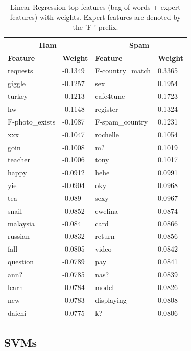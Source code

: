 \documentclass[preprint]{acm_proc_article-sp}
\begin{document}
\begin{table}
\begin{tabular}{l|l||l|l}
\multicolumn{2}{c}{\textbf{Ham}} & 
\multicolumn{2}{c}{\textbf{Spam}} \\
\hline
\textbf{Feature} & \textbf{Weight} & \textbf{Feature} & \textbf{Weight} \\
\hline

requests & -0.1349 & F-country\_match & 0.3365\\
giggle & -0.1257 & sex & 0.1954\\
turkey & -0.1213 & cafe4tune & 0.1723\\
hw & -0.1148 & register & 0.1324\\
F-photo\_exists & -0.1087 & F-spam\_country & 0.1231\\
xxx & -0.1047 & rochelle & 0.1054\\
goin & -0.1008 & m? & 0.1019\\
teacher & -0.1006 & tony & 0.1017\\
happy & -0.0912 & hehe & 0.0991\\
yie & -0.0904 & oky & 0.0968\\
tea & -0.089 & sexy & 0.0967\\
snail & -0.0852 & ewelina & 0.0874\\
malaysia & -0.084 & card & 0.0866\\
russian & -0.0832 & return & 0.0856\\
fall & -0.0805 & video & 0.0842\\
question & -0.0789 & pay & 0.0841\\
ann? & -0.0785 & nas? & 0.0839\\
learn & -0.0784 & model & 0.0826\\
new & -0.0783 & displaying & 0.0808\\
daichi & -0.0775 & k?  & 0.0806\\

\end{tabular}
\caption{Linear Regression top features (bag-of-words + expert features) with weights. Expert features
are denoted by the 'F-' prefix.}
\label{tab:lrfeats}
\end{table}

\subsection{SVMs}
\end{document}
